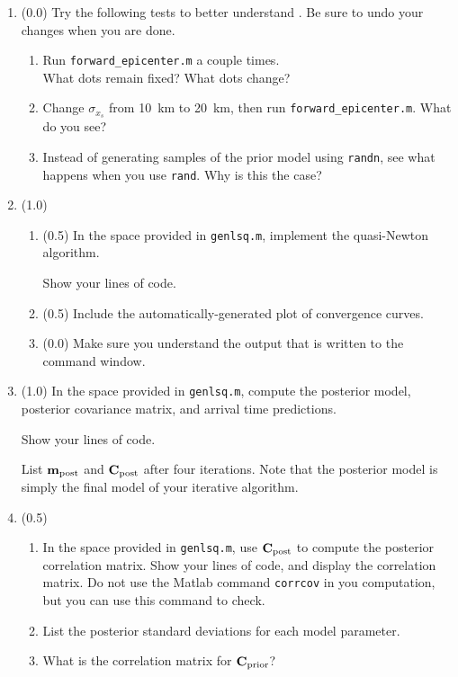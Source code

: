 \documentclass[11pt,titlepage,fleqn]{article}
\begin{document}
\begin{enumerate}

\item (0.0) Try the following tests to better understand . Be sure to undo your changes when you are done.
%
\begin{enumerate}
\item Run \verb+forward_epicenter.m+ a couple times. \\
What dots remain fixed? What dots change?

\item Change $\sigma_{x_s}$ from 10~km to 20~km, then run \verb+forward_epicenter.m+. What do you see?

\item Instead of generating samples of the prior model using \verb+randn+, see what happens when you use \verb+rand+. Why is this the case?
\end{enumerate}

\item (1.0)
%
\begin{enumerate}
\item (0.5) In the space provided in \verb+genlsq.m+, implement the quasi-Newton algorithm.

Show your lines of code.

\item (0.5) Include the automatically-generated plot of convergence curves.

\item (0.0) Make sure you understand the output that is written to the command window.
\end{enumerate}


\item (1.0) In the space provided in \verb+genlsq.m+, compute the posterior model, posterior covariance matrix, and arrival time predictions.

Show your lines of code.

List $\mbox{${\bf m}$}_{\rm post}$ and $\mbox{${\bf C}$}_{\rm post}$ after four iterations. Note that the posterior model is simply the final model of your iterative algorithm.


\item (0.5) 
\begin{enumerate}
\item In the space provided in \verb+genlsq.m+, use $\mbox{${\bf C}$}_{\rm post}$ to compute the posterior correlation matrix. Show your lines of code, and display the correlation matrix. Do not use the Matlab command \verb+corrcov+ in you computation, but you can use this command to check.

\item List the posterior standard deviations for each model parameter.

\item What is the correlation matrix for $\mbox{${\bf C}$}_{\rm prior}$?
\end{enumerate}

\end{enumerate}
\end{document}
